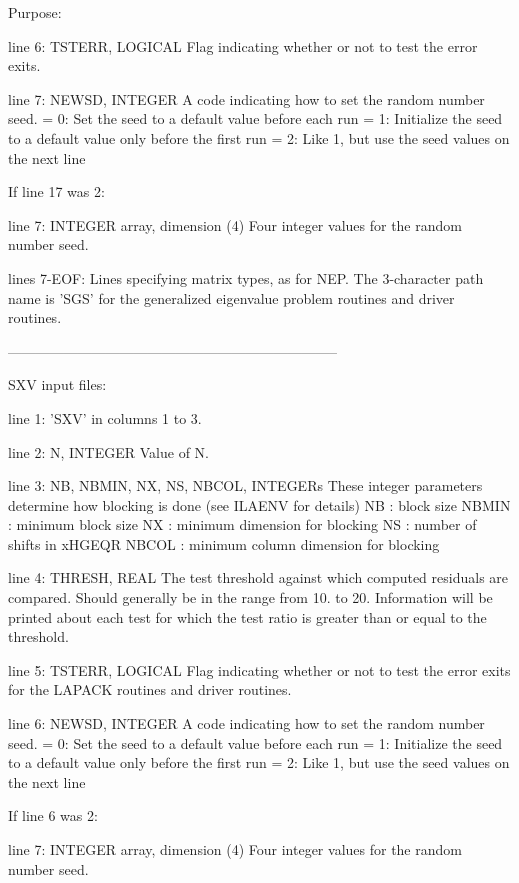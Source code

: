 \begin{DoxyParagraph}{Purpose\+: }
\begin{DoxyVerb}
 line 6:  TSTERR, LOGICAL
          Flag indicating whether or not to test the error exits.

 line 7:  NEWSD, INTEGER
          A code indicating how to set the random number seed.
          = 0:  Set the seed to a default value before each run
          = 1:  Initialize the seed to a default value only before the
                first run
          = 2:  Like 1, but use the seed values on the next line

 If line 17 was 2:

 line 7:  INTEGER array, dimension (4)
          Four integer values for the random number seed.

 lines 7-EOF:  Lines specifying matrix types, as for NEP.
          The 3-character path name is 'SGS' for the generalized
          eigenvalue problem routines and driver routines.

-----------------------------------------------------------------------

 SXV input files:

 line 1:  'SXV' in columns 1 to 3.

 line 2:  N, INTEGER
          Value of N.

 line 3:  NB, NBMIN, NX, NS, NBCOL, INTEGERs
          These integer parameters determine how blocking is done
          (see ILAENV for details)
          NB     : block size
          NBMIN  : minimum block size
          NX     : minimum dimension for blocking
          NS     : number of shifts in xHGEQR
          NBCOL  : minimum column dimension for blocking

 line 4:  THRESH, REAL
          The test threshold against which computed residuals are
          compared. Should generally be in the range from 10. to 20.
          Information will be printed about each test for which the
          test ratio is greater than or equal to the threshold.

 line 5:  TSTERR, LOGICAL
          Flag indicating whether or not to test the error exits for
          the LAPACK routines and driver routines.

 line 6:  NEWSD, INTEGER
          A code indicating how to set the random number seed.
          = 0:  Set the seed to a default value before each run
          = 1:  Initialize the seed to a default value only before the
                first run
          = 2:  Like 1, but use the seed values on the next line

 If line 6 was 2:

 line 7: INTEGER array, dimension (4)
          Four integer values for the random number seed.


\end{DoxyVerb}
\end{DoxyParagraph}
